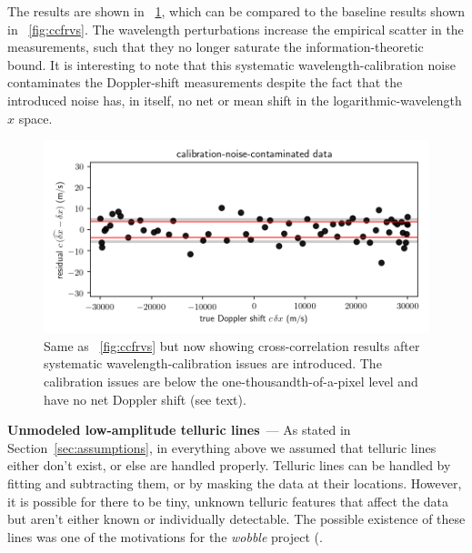\documentclass[modern]{aastex631}
\renewcommand{\paragraph}[1]{\bigskip\noindent\textbf{#1}~---}
\newcommand{\sectionname}{Section}
\newcommand{\secref}[1]{\sectionname~\ref{#1}}
\newcommand{\figref}[1]{\figurename~\ref{#1}}
\begin{document}
The results are shown in \figref{fig:calibration}, which can be compared to the baseline results shown in \figref{fig:ccfrvs}.
The wavelength perturbations increase the empirical scatter in the measurements, such that they no longer saturate the information-theoretic bound.
It is interesting to note that this systematic wavelength-calibration noise contaminates the Doppler-shift measurements despite the fact that the introduced noise has, in itself, no net or mean shift in the logarithmic-wavelength $x$ space.

\begin{figure}[tp]
  \begin{mdframed}
    \begin{center}
    \includegraphics[width=\textwidth]{../notebook/calibration.png}
    \end{center}
    \caption{Same as \figref{fig:ccfrvs} but now showing cross-correlation results after systematic wavelength-calibration issues are introduced. The calibration issues are below the one-thousandth-of-a-pixel level and have no net Doppler shift (see text).\label{fig:calibration}}
  \end{mdframed}
\end{figure}

\paragraph{Unmodeled low-amplitude telluric lines}
As stated in \secref{sec:assumptions}, in everything above we assumed that telluric lines either don't exist, or else are handled properly.
Telluric lines can be handled by fitting and subtracting them, or by masking the data at their locations.
However, it is possible for there to be tiny, unknown telluric features that affect the data but aren't either known or individually detectable.
The possible existence of these lines was one of the motivations for the \textsl{wobble} project (\citealt{wobble)}.
\end{document}
